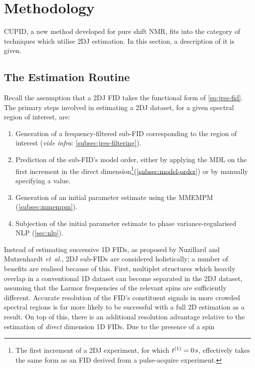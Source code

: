 \section{Methodology}
\ac{CUPID}, a new method developed for pure shift \ac{NMR}, fits into the category
of techniques which utilise \ac{2DJ} estimation. In this section, a description
of it is given.

\subsection{The Estimation Routine}
Recall the assumption that a \ac{2DJ} \ac{FID} takes the functional form
of \cref{eq:jres-fid}. The primary steps involved in estimating a \ac{2DJ}
dataset, for a given spectral region of interest, are:
\begin{enumerate}
    \item Generation of a frequency-filtered sub-\ac{FID} corresponding to
        the region of interest (\textit{vide infra}:
        \cref{subsec:jres-filtering}).
    \item Prediction of the sub-\ac{FID}'s model order, either by applying the
        \ac{MDL} on the first increment in the direct dimension\footnote{
            The first increment of a \ac{2DJ} experiment, for which $t^{(1)} =
            \qty{0}{\second}$, effectively takes the same form as an \ac{FID}
            derived from a pulse-acquire experiment.
        }(\cref{subsec:model-order}) or
        by manually specifying a
        value.
    \item Generation of an initial parameter estimate using the \ac{MMEMPM}
        (\cref{subsec:mmempm}).
    \item Subjection of the initial parameter estimate to phase
        variance-regularised \ac{NLP} (\cref{sec:nlp}).
\end{enumerate}
Instead of estimating successive \ac{1D} \acp{FID}, as proposed by
Nuzillard and Mutzenhardt \emph{et~al.}, \ac{2DJ} sub-\acp{FID} are considered
holistically; a number of benefits are realised because of this.
First, multiplet structures which heavily overlap in a
conventional \ac{1D} dataset can become separated in the \ac{2DJ} dataset,
assuming that the Larmor frequencies of the relevant spins are sufficiently
different.
Accurate resolution of the \ac{FID}'s constituent signals in more crowded spectral
regions is far more likely to be successful with a full \ac{2D} estimation as a
result.
On top of this, there is an additional resolution advantage relative to the
estimation of \emph{direct} dimension \ac{1D} \acp{FID}. Due to the presence of a spin
